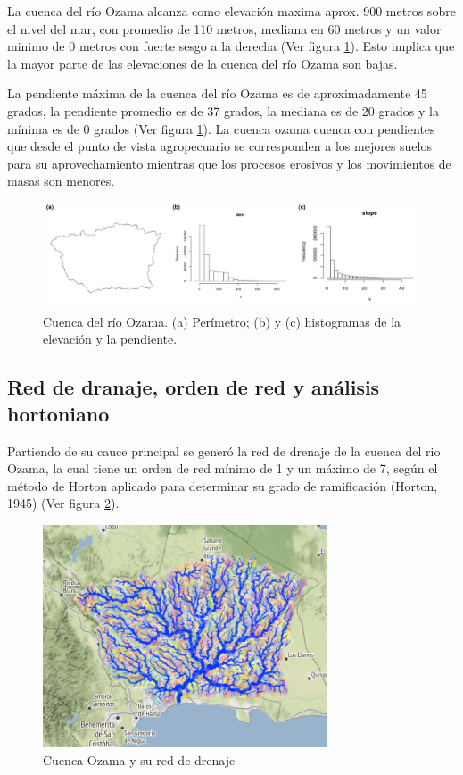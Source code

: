 \documentclass[11pt,]{article}
\begin{document}
La cuenca del río Ozama alcanza como elevación maxima aprox. 900 metros
sobre el nivel del mar, con promedio de 110 metros, mediana en 60 metros
y un valor minimo de 0 metros con fuerte sesgo a la derecha (Ver figura
\ref{fig:3_n_1}). Esto implica que la mayor parte de las elevaciones de
la cuenca del río Ozama son bajas.

La pendiente máxima de la cuenca del río Ozama es de aproximadamente 45
grados, la pendiente promedio es de 37 grados, la mediana es de 20
grados y la mínima es de 0 grados (Ver figura \ref{fig:3_n_1}). La
cuenca ozama cuenca con pendientes que desde el punto de vista
agropecuario se corresponden a los mejores suelos para su
aprovechamiento mientras que los procesos erosivos y los movimientos de
masas son menores.

\begin{figure}
\centering
\includegraphics[width=1.00000\textwidth]{Productos Generados/3_en_1.jpg}
\caption{\label{fig:3_n_1}Cuenca del río Ozama. (a) Perímetro; (b) y (c)
histogramas de la elevación y la pendiente.}
\end{figure}

\subsection{Red de dranaje, orden de red y análisis
hortoniano}\label{red-de-dranaje-orden-de-red-y-anuxe1lisis-hortoniano}

Partiendo de su cauce principal se generó la red de drenaje de la cuenca
del rio Ozama, la cual tiene un orden de red mínimo de 1 y un máximo de
7, según el método de Horton aplicado para determinar su grado de
ramificación (Horton, 1945) (Ver figura \ref{fig:C_O}).

\begin{figure}
\centering
\includegraphics[width=0.75000\textwidth]{Productos Generados/cuencas_y_orden_de_red_salida1.png}
\caption{\label{fig:C_O}Cuenca Ozama y su red de drenaje}
\end{figure}
\end{document}
